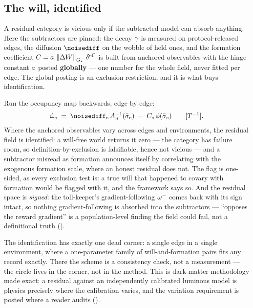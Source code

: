 \documentclass[../main]{subfiles}
\begin{document}
\subsection{The will, identified}
\label{subsec:maint:ident}
%
A residual category is vicious only if the subtracted model can absorb anything. Here
the subtractors are pinned: the decay $\gamma$ is measured on protocol-released
edges, the diffusion $\noisediff$ on the wobble of held ones, and the formation
coefficient $C=\hingeA\,\normG{\surplus}\,\effdensity$ is built from anchored
observables with the hinge constant $a$ posted \textbf{globally} --- one number
for the whole field, never fitted per edge. The global posting is an exclusion
restriction, and it is what buys identification.

\begin{proposition}%
  Run the occupancy map backwards, edge by edge:
  \begin{equation}
    \willresid[e]\;=\;\noisediff_{e}\,\Abessel^{-1}(\bar\leanbare_{e})
      \;-\;C_{e}\,\bendfn(\bar\leanbare_{e})
    \qquad\dimrate.
    \label{eq:maint:ident}
  \end{equation}
  Where the anchored observables vary across edges and environments, the residual
  field is identified: a will-free world returns it zero --- the category has failure
  room, so definition-by-exclusion is falsifiable, hence not vicious --- and a
  subtractor misread as formation announces itself by correlating with the exogenous
  formation scale, where an honest residual does not. The flag is one-sided, as every
  exclusion test is: a true will that happened to covary with formation would be flagged
  with it, and the framework says so. And the residual space is \emph{signed}: the
  toll-keeper's gradient-following $\omega\sp{-}$ comes back with its sign intact, so
  nothing gradient-following is absorbed into the subtractors --- ``opposes the reward
  gradient'' is a population-level finding the field could fail, not a definitional
  truth ().
\end{proposition}

The identification has exactly one dead corner: a single edge in a single environment,
where a one-parameter family of will-and-formation pairs fits any record exactly. There
the scheme is a consistency check, not a measurement --- the circle lives in the
corner, not in the method. This is dark-matter methodology made exact: a residual
against an independently calibrated luminous model is physics precisely where the
calibration varies, and the variation requirement is posted where a reader audits
().
\end{document}
